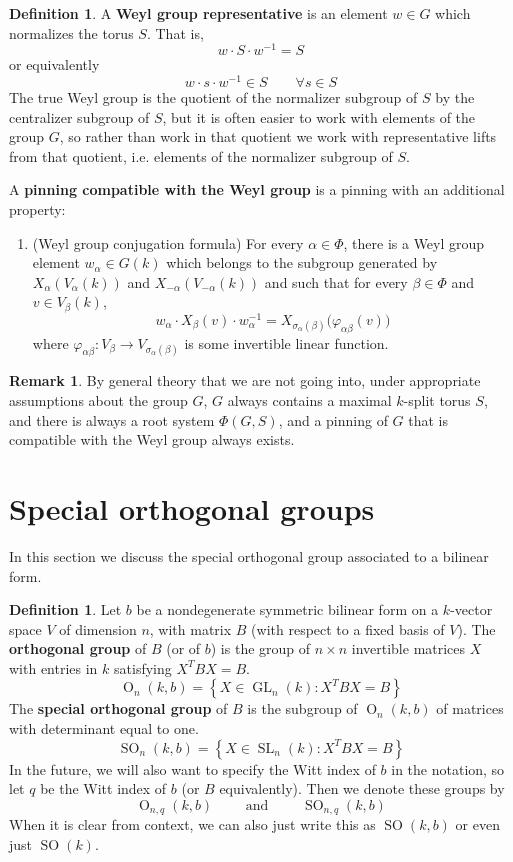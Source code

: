\documentclass[12pt]{article}
\theoremstyle{definition}
\newtheorem{definition}[theorem]{Definition}
\newtheorem{remark}[theorem]{Remark}
\newcommand{\sig}{\sigma}
\newcommand{\lb}{\left\{}
\newcommand{\rb}{\right\}}
\newcommand{\tbf}{\textbf}
\newcommand{\inv}{^{-1}}
\DeclareMathOperator{\SL}{SL}
\DeclareMathOperator{\GL}{GL}
\DeclareMathOperator{\OO}{O}
\DeclareMathOperator{\SO}{SO}
\begin{document}
\begin{definition}
A \tbf{Weyl group representative} is an element $w \in G$ which normalizes the torus $S$. That is,
\[
	w \cdot S \cdot w \inv = S
\]
or equivalently
\[
	w \cdot s \cdot w \inv \in S \qquad \forall s \in S
\]
The true Weyl group is the quotient of the normalizer subgroup of $S$ by the centralizer subgroup of $S$, but it is often easier to work with elements of the group $G$, so rather than work in that quotient we work with representative lifts from that quotient, i.e. elements of the normalizer subgroup of $S$.

A \tbf{pinning compatible with the Weyl group} is a pinning with an additional property:
\begin{enumerate}
	\item[5.] (Weyl group conjugation formula) For every $\alpha \in \Phi$, there is a Weyl group element $w_\alpha \in G(k)$ which belongs to the subgroup generated by $X_\alpha(V_\alpha(k))$ and $X_{-\alpha}(V_{-\alpha}(k))$ and such that for every $\beta \in \Phi$ and $v \in V_\beta(k)$, 
	\[
		w_\alpha \cdot X_\beta(v) \cdot w_\alpha \inv = X_{\sig_\alpha(\beta)} \Big( \varphi_{\alpha \beta} (v) \Big)
	\]
	where $\varphi_{\alpha \beta}:V_\beta \to V_{\sig_\alpha(\beta)}$ is some invertible linear function.
\end{enumerate}
\end{definition}

\begin{remark}
By general theory that we are not going into, under appropriate assumptions about the group $G$, $G$ always contains a maximal $k$-split torus $S$, and there is always a root system $\Phi(G,S)$, and a pinning of $G$ that is compatible with the Weyl group always exists.
\end{remark}

\newpage
\section{Special orthogonal groups}

In this section we discuss the special orthogonal group associated to a bilinear form.

\begin{definition}
Let $b$ be a nondegenerate symmetric bilinear form on a $k$-vector space $V$ of dimension $n$, with matrix $B$ (with respect to a fixed basis of $V$). The \tbf{orthogonal group} of $B$ (or of $b$) is the group of $n \times n$ invertible matrices $X$ with entries in $k$ satisfying $X^T BX = B$.
\[
	\OO_n(k,b) = \lb X \in \GL_n(k) : X^T BX = B \rb
\]
The \tbf{special orthogonal group} of $B$ is the subgroup of $\OO_n(k, b)$ of matrices with determinant equal to one.
\[
	\SO_n(k,b) = \lb X \in \SL_n(k) : X^T BX = B \rb
\]
In the future, we will also want to specify the Witt index of $b$ in the notation, so let $q$ be the Witt index of $b$ (or $B$ equivalently). Then we denote these groups by
\[
	\OO_{n,q}(k,b) \qquad \text{ and } \qquad \SO_{n,q}(k,b)
\]
When it is clear from context, we can also just write this as $\SO(k,b)$ or even just $\SO(k)$.
\end{definition}
\end{document}
